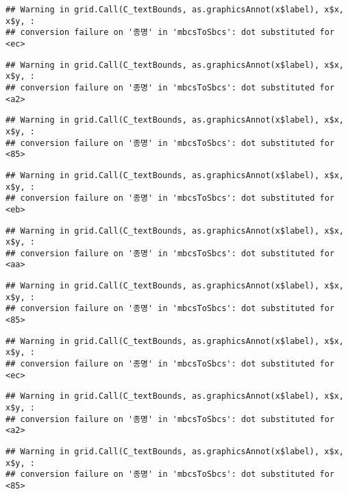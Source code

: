 \documentclass[
]{article}
\begin{document}
\begin{verbatim}
## Warning in grid.Call(C_textBounds, as.graphicsAnnot(x$label), x$x, x$y, :
## conversion failure on '종명' in 'mbcsToSbcs': dot substituted for <ec>
\end{verbatim}

\begin{verbatim}
## Warning in grid.Call(C_textBounds, as.graphicsAnnot(x$label), x$x, x$y, :
## conversion failure on '종명' in 'mbcsToSbcs': dot substituted for <a2>
\end{verbatim}

\begin{verbatim}
## Warning in grid.Call(C_textBounds, as.graphicsAnnot(x$label), x$x, x$y, :
## conversion failure on '종명' in 'mbcsToSbcs': dot substituted for <85>
\end{verbatim}

\begin{verbatim}
## Warning in grid.Call(C_textBounds, as.graphicsAnnot(x$label), x$x, x$y, :
## conversion failure on '종명' in 'mbcsToSbcs': dot substituted for <eb>
\end{verbatim}

\begin{verbatim}
## Warning in grid.Call(C_textBounds, as.graphicsAnnot(x$label), x$x, x$y, :
## conversion failure on '종명' in 'mbcsToSbcs': dot substituted for <aa>
\end{verbatim}

\begin{verbatim}
## Warning in grid.Call(C_textBounds, as.graphicsAnnot(x$label), x$x, x$y, :
## conversion failure on '종명' in 'mbcsToSbcs': dot substituted for <85>
\end{verbatim}

\begin{verbatim}
## Warning in grid.Call(C_textBounds, as.graphicsAnnot(x$label), x$x, x$y, :
## conversion failure on '종명' in 'mbcsToSbcs': dot substituted for <ec>
\end{verbatim}

\begin{verbatim}
## Warning in grid.Call(C_textBounds, as.graphicsAnnot(x$label), x$x, x$y, :
## conversion failure on '종명' in 'mbcsToSbcs': dot substituted for <a2>
\end{verbatim}

\begin{verbatim}
## Warning in grid.Call(C_textBounds, as.graphicsAnnot(x$label), x$x, x$y, :
## conversion failure on '종명' in 'mbcsToSbcs': dot substituted for <85>
\end{verbatim}
\end{document}
